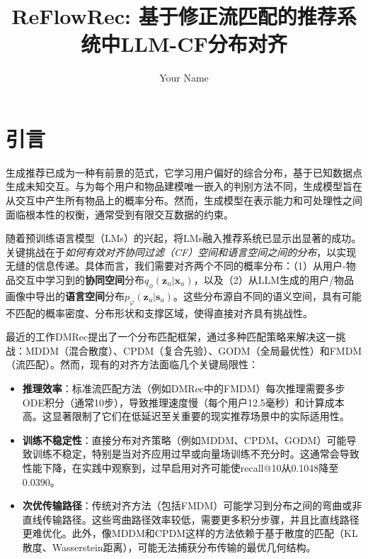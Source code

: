 \documentclass[sigconf]{acmart}
\title{ReFlowRec: 基于修正流匹配的推荐系统中LLM-CF分布对齐}
\author{Your Name}
\affiliation{%
  \institution{Your Institution}
  \city{Your City}
  \country{Your Country}}
\begin{document}
\maketitle

\section{引言}
生成推荐\cite{liang2018variational, wang2023diffusion}已成为一种有前景的范式，它学习用户偏好的综合分布，基于已知数据点生成未知交互。与为每个用户和物品建模唯一嵌入的判别方法不同\cite{he2020lightgcn}，生成模型旨在从交互中产生所有物品上的概率分布\cite{liang2018variational}。然而，生成模型在表示能力和可处理性之间面临根本性的权衡\cite{kingma2016improved}，通常受到有限交互数据的约束。

随着预训练语言模型（LMs）的兴起\cite{touvron2023llama, zhao2023survey}，将LMs融入推荐系统已显示出显著的成功\cite{xi2024towards, ren2024representation, wei2024llmrec}。关键挑战在于\textit{如何有效对齐协同过滤（CF）空间和语言空间之间的分布}，以实现无缝的信息传递。具体而言，我们需要对齐两个不同的概率分布：（1）从用户-物品交互中学习到的\textbf{协同空间}分布$q_\phi(\mathbf z_u|\mathbf x_u)$，以及（2）从LLM生成的用户/物品画像中导出的\textbf{语言空间}分布$p_\varphi(\mathbf z_u|\mathbf s_u)$。这些分布源自不同的语义空间，具有可能不匹配的概率密度、分布形状和支撑区域，使得直接对齐具有挑战性。

最近的工作DMRec\cite{zhang2024dmrec}提出了一个分布匹配框架，通过多种匹配策略来解决这一挑战：MDDM（混合散度）、CPDM（复合先验）、GODM（全局最优性）和FMDM（流匹配）。然而，现有的对齐方法面临几个关键局限性：

\begin{itemize}[leftmargin=*]
\item[$\bullet$] \textbf{推理效率}：标准流匹配方法（例如DMRec中的FMDM）每次推理需要多步ODE积分（通常10步），导致推理速度慢（每个用户12.5毫秒）和计算成本高。这显著限制了它们在低延迟至关重要的现实推荐场景中的实际适用性。
\item[$\bullet$] \textbf{训练不稳定性}：直接分布对齐策略（例如MDDM、CPDM、GODM）可能导致训练不稳定，特别是当对齐应用过早或向量场训练不充分时。这通常会导致性能下降，在实践中观察到，过早启用对齐可能使recall@10从0.1048降至0.0390。
\item[$\bullet$] \textbf{次优传输路径}：传统对齐方法（包括FMDM）可能学习到分布之间的弯曲或非直线传输路径。这些弯曲路径效率较低，需要更多积分步骤，并且比直线路径更难优化。此外，像MDDM和CPDM这样的方法依赖于基于散度的匹配（KL散度、Wasserstein距离），可能无法捕获分布传输的最优几何结构。
\end{itemize}
\end{document}
